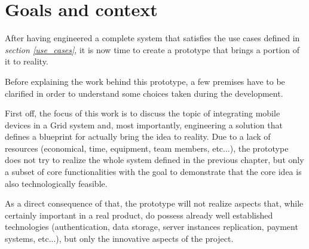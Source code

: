 \section{Goals and context}
After having engineered a complete system that satisfies the use cases defined in \textit{section \ref{use_cases}}, it is now time to create a prototype that brings a portion of it to reality.

Before explaining the work behind this prototype, a few premises have to be clarified in order to understand some choices taken during the development.

First off, the focus of this work is to discuss the topic of integrating mobile devices in a Grid system and, most importantly, engineering a solution that defines a blueprint for actually bring the idea to reality. Due to a lack of resources (economical, time, equipment, team members, etc...), the prototype does not try to realize the whole system defined in the previous chapter, but only a subset of core functionalities with the goal to demonstrate that the core idea is also technologically feasible.

As a direct consequence of that, the prototype will not realize aspects that, while certainly important in a real product, do possess already well established technologies (authentication, data storage, server instances replication, payment systems, etc...), but only the innovative aspects of the project.